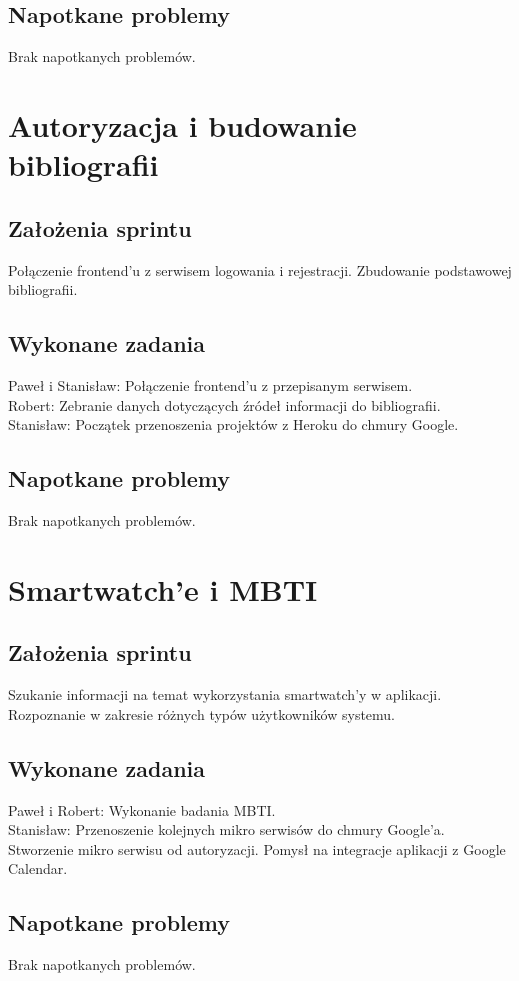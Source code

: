 \documentclass[a4paper,11pt]{report}
\begin{document}
\subsection {Napotkane problemy}
Brak napotkanych problemów.

\section {Autoryzacja i budowanie bibliografii}
\label{sec:system_autoryzacji_uzytkownika}
\subsection {Założenia sprintu}
Połączenie frontend'u z serwisem logowania i rejestracji. Zbudowanie podstawowej bibliografii.
\subsection {Wykonane zadania}
Paweł i Stanisław: Połączenie frontend'u z przepisanym serwisem.\\
Robert: Zebranie danych dotyczących źródeł informacji do bibliografii.\\
Stanisław: Początek przenoszenia projektów z Heroku do chmury Google.\\
\subsection {Napotkane problemy}
Brak napotkanych problemów.

\section {Smartwatch'e i MBTI}
\subsection {Założenia sprintu}
Szukanie informacji na temat wykorzystania smartwatch'y w aplikacji. Rozpoznanie w zakresie różnych typów użytkowników systemu. 
\subsection {Wykonane zadania}
Paweł i Robert: Wykonanie badania MBTI.\\
Stanisław: Przenoszenie kolejnych mikro serwisów do chmury Google'a. Stworzenie mikro serwisu od autoryzacji. Pomysł na integracje aplikacji z Google Calendar.\\
\subsection {Napotkane problemy}
Brak napotkanych problemów.
\end{document}
